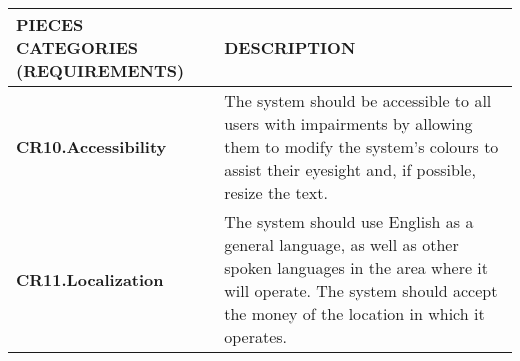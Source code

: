 \documentclass[9pt]{report}
\begin{document}
\begin{tabular}{ |p{4cm}|p{12cm}| }
 \hline
 \rowcolor{lightgray} \textbf{PIECES CATEGORIES (REQUIREMENTS)} & \textbf{DESCRIPTION}\\
 \hline
 \textbf{CR10.Accessibility}& The system should be accessible to all users with impairments by allowing them to modify the system's colours to assist their eyesight and, if possible, resize the text.
 \\
 \hline
 \textbf{CR11.Localization}& The system should use English as a general language, as well as other spoken languages in the area where it will operate. The system should accept the money of the location in which it operates.
\\
 \hline
\end{tabular}




\newpage



\end{document}
